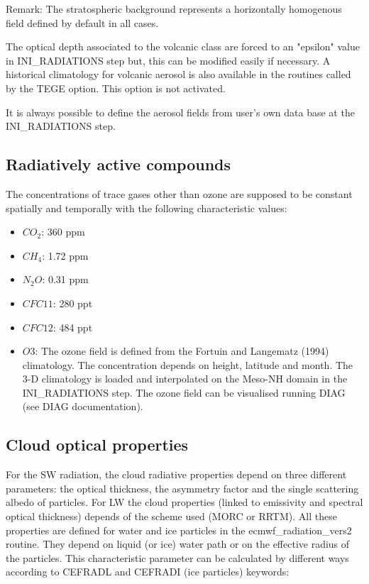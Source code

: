 Remark: The stratospheric background represents a horizontally homogenous field defined by default in all cases.

The optical depth associated to the volcanic class are forced to an "epsilon" value in INI\_RADIATIONS step but, this can be modified easily if necessary. A historical climatology for volcanic aerosol is also available in the routines called by the TEGE option. This option is not activated.

It is always possible to define the aerosol fields from user's own data base at the INI\_RADIATIONS step.

\subsection{Radiatively active compounds}

The concentrations of trace gases other than ozone are supposed to be constant spatially and temporally with the following characteristic values: 
\begin{itemize}
\item  $CO_{2}$: 360 ppm
\item  $CH_{4}$: 1.72 ppm
\item  $N_{2}O$: 0.31 ppm
\item  $CFC11$: 280 ppt
\item  $CFC12$: 484 ppt
\item  $O{3}$: The ozone field is defined from the Fortuin and Langematz (1994) climatology. The concentration depends on height, latitude and month. The 3-D climatology is loaded and interpolated on the Meso-NH domain in the INI\_RADIATIONS step. The ozone field can be visualised running DIAG (see DIAG documentation). 
\end{itemize}



\subsection{Cloud optical properties}\label{subsecoptical}
For the SW radiation, the cloud radiative properties depend on three different parameters: the optical thickness, the asymmetry factor and the single scattering albedo of particles. For LW the cloud properties (linked to emissivity and spectral optical thickness) depends of the scheme used (MORC or RRTM). All these properties are defined for water and ice particles in the ecmwf\_radiation\_vers2 routine. They depend on liquid (or ice) water path or on the effective radius of the particles. This characteristic parameter can be calculated by different ways according to CEFRADL and CEFRADI (ice particles) keywords:\\

